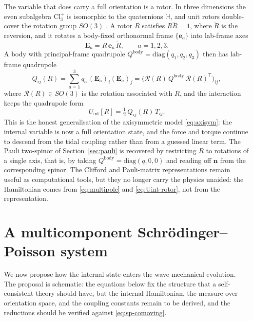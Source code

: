 \documentclass[11pt,a4paper]{article}
\newcommand{\nn}{\mathbf{n}}
\newcommand{\half}{\tfrac{1}{2}}
\begin{document}
The variable that does carry a full orientation is a rotor. In three dimensions the
even subalgebra $\mathrm{Cl}_3^{+}$ is isomorphic to the quaternions $\mathbb{H}$, and
unit rotors double-cover the rotation group $SO(3)$ \citep{lounesto2001,mtw1973}. A
rotor $R$ satisfies $R\tilde{R}=1$, where $\tilde{R}$ is the reversion, and it rotates a
body-fixed orthonormal frame $\{\mathbf{e}_a\}$ into lab-frame axes
%
\begin{equation}
  \mathbf{E}_a = R\,\mathbf{e}_a\,\tilde{R}, \qquad a = 1,2,3 .
\end{equation}
%
A body with principal-frame quadrupole
$Q^{\mathrm{body}} = \mathrm{diag}(q_1,q_2,q_3)$ then has lab-frame quadrupole
%
\begin{equation}
  Q_{ij}(R) = \sum_{a=1}^{3} q_a\,(\mathbf{E}_a)_i (\mathbf{E}_a)_j
  = \bigl(\mathcal{R}(R)\,Q^{\mathrm{body}}\,\mathcal{R}(R)^{\mathsf{T}}\bigr)_{ij},
  \label{eq:Qrotor}
\end{equation}
%
where $\mathcal{R}(R)\in SO(3)$ is the rotation associated with $R$, and the interaction
keeps the quadrupole form
%
\begin{equation}
  U_{\mathrm{int}}[R] = \half\,Q_{ij}(R)\,T_{ij}.
  \label{eq:Uint-rotor}
\end{equation}
%
This is the honest generalisation of the axisymmetric model \eqref{eq:axisym}: the
internal variable is now a full orientation state, and the force and torque continue to
descend from the tidal coupling rather than from a guessed linear term. The Pauli
two-spinor of Section~\ref{sec:pauli} is recovered by restricting $R$ to rotations of a
single axis, that is, by taking $Q^{\mathrm{body}}=\mathrm{diag}(q,0,0)$ and reading off
$\nn$ from the corresponding spinor. The Clifford and Pauli-matrix representations
remain useful as computational tools, but they no longer carry the physics unaided: the
Hamiltonian comes from \eqref{eq:multipole} and \eqref{eq:Uint-rotor}, not from the
representation.

\section{A multicomponent Schr\"odinger--Poisson system}
\label{sec:multicomponent}

We now propose how the internal state enters the wave-mechanical evolution. The proposal
is schematic: the equations below fix the structure that a self-consistent theory should
have, but the internal Hamiltonian, the measure over orientation space, and the coupling
constants remain to be derived, and the reductions should be verified against
\eqref{eq:sp-comoving}.
\end{document}
